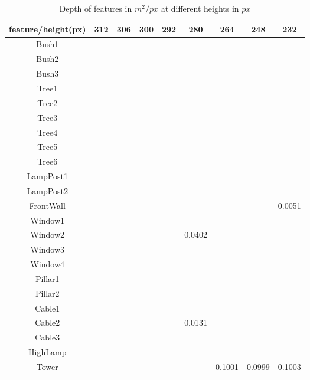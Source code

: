 \begin{table}[!htb]
\centering
    \begin{tabular}{| c | c | c | c | c | c | c | c | c |}
    \hline
    feature/height(px) & 312 & 306 & 300 & 292 & 280 & 264 & 248 & 232 \\ \hline
		 Bush1 &  &  &  &  &  &  &  & \\ \hline
		 Bush2 &  &  &  &  &  &  &  & \\ \hline	
		 Bush3 &  &  &  &  &  &  &  & \\ \hline	
		 Tree1 &  &  &  &  &  &  &  & \\ \hline	
		 Tree2 &  &  &  &  &  &  &  & \\ \hline	
		 Tree3 &  &  &  &  &  &  &  & \\ \hline	
		 Tree4 &  &  &  &  &  &  &  & \\ \hline	
		 Tree5 &  &  &  &  &  &  &  & \\ \hline	
		 Tree6 &  &  &  &  &  &  &  & \\ \hline	
     LampPost1 &  &  &  &  &  &  &  & \\ \hline
		 LampPost2 &  &  &  &  &  &  &  & \\ \hline
		 FrontWall &  &  &  &  &  &  &  & 0.0051\\ \hline
		 Window1 &  &  &  &  &  &  &  & \\ \hline
		 Window2 &  &  &  &  & 0.0402 &  &  & \\ \hline
		 Window3 &  &  &  &  &  &  &  & \\ \hline
		 Window4 &  &  &  &  &  &  &  & \\ \hline
		 Pillar1 &  &  &  &  &  &  &  & \\ \hline
		 Pillar2 &  &  &  &  &  &  &  & \\ \hline
		 Cable1 &  &  &  &  &  &  &  & \\ \hline
	   Cable2 &  &  &  &  & 0.0131 &  &  & \\ \hline
	   Cable3 &  &  &  &  &  &  &  & \\ \hline
		 HighLamp &  &  &  &  &  &  &  & \\ \hline
	   Tower &  &  &  &  &  & 0.1001 & 0.0999 & 0.1003 \\ \hline
    \end{tabular}
		\caption{Depth of features in $m^2/px$ at different heights in $px$}\label{table4}
\end{table}

